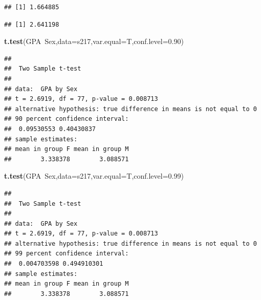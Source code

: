 \documentclass[]{book}
\newenvironment{Shaded}{\begin{snugshade}}{\end{snugshade}}
\newcommand{\KeywordTok}[1]{\textcolor[rgb]{0.13,0.29,0.53}{\textbf{{#1}}}}
\newcommand{\DataTypeTok}[1]{\textcolor[rgb]{0.13,0.29,0.53}{{#1}}}
\newcommand{\DecValTok}[1]{\textcolor[rgb]{0.00,0.00,0.81}{{#1}}}
\newcommand{\FloatTok}[1]{\textcolor[rgb]{0.00,0.00,0.81}{{#1}}}
\newcommand{\CommentTok}[1]{\textcolor[rgb]{0.56,0.35,0.01}{\textit{{#1}}}}
\newcommand{\NormalTok}[1]{{#1}}
\begin{document}
\begin{Shaded}
\end{Shaded}

\begin{verbatim}
## [1] 1.664885
\end{verbatim}

\begin{Shaded}
\end{Shaded}

\begin{verbatim}
## [1] 2.641198
\end{verbatim}

\begin{Shaded}
\begin{Highlighting}[]
\KeywordTok{t.test}\NormalTok{(GPA~Sex,}\DataTypeTok{data=}\NormalTok{s217,}\DataTypeTok{var.equal=}\NormalTok{T,}\DataTypeTok{conf.level=}\FloatTok{0.90}\NormalTok{)}
\end{Highlighting}
\end{Shaded}

\begin{verbatim}
## 
##  Two Sample t-test
## 
## data:  GPA by Sex
## t = 2.6919, df = 77, p-value = 0.008713
## alternative hypothesis: true difference in means is not equal to 0
## 90 percent confidence interval:
##  0.09530553 0.40430837
## sample estimates:
## mean in group F mean in group M 
##        3.338378        3.088571
\end{verbatim}

\begin{Shaded}
\begin{Highlighting}[]
\KeywordTok{t.test}\NormalTok{(GPA~Sex,}\DataTypeTok{data=}\NormalTok{s217,}\DataTypeTok{var.equal=}\NormalTok{T,}\DataTypeTok{conf.level=}\FloatTok{0.99}\NormalTok{)}
\end{Highlighting}
\end{Shaded}

\begin{verbatim}
## 
##  Two Sample t-test
## 
## data:  GPA by Sex
## t = 2.6919, df = 77, p-value = 0.008713
## alternative hypothesis: true difference in means is not equal to 0
## 99 percent confidence interval:
##  0.004703598 0.494910301
## sample estimates:
## mean in group F mean in group M 
##        3.338378        3.088571
\end{verbatim}
\end{document}
